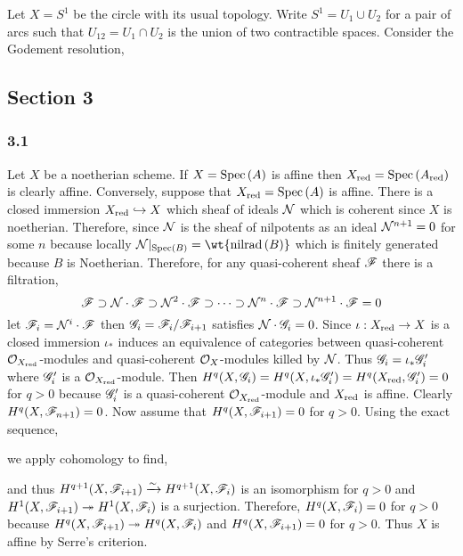 \documentclass[12pt]{article}
\begin{document}
Let $X = S^1$ be the circle with its usual topology. Write $S^1 = U_1 \cup U_2$ for a pair of arcs such that $U_{12} = U_1 \cap U_2$ is the union of two contractible spaces. Consider the Godement resolution,
\begin{center}
\end{center}

\subsection{Section 3}

\subsubsection{3.1}

Let $X$ be a noetherian scheme. If $X = \mathrm{Spec}\left( A \right)$ is affine then $X_{\mathrm{red}} = \mathrm{Spec}\left( A_{\mathrm{red}} \right)$ is clearly affine. Conversely, suppose that $X_{\mathrm{red}} = \mathrm{Spec}\left( A \right)$ is affine. There is a closed immersion $X_{\mathrm{red}} \hookrightarrow X$ which sheaf of ideals $\mathcal{N}$ which is coherent since $X$ is noetherian. Therefore, since $\mathcal{N}$ is the sheaf of nilpotents as an ideal $\mathcal{N}^{n+1} = 0$ for some $n$ because locally $\sN |_{\Spec{B}} = \wt{\nilrad{B}}$ which is finitely generated because $B$ is Noetherian. Therefore, for any quasi-coherent sheaf $\mathscr{F}$ there is a filtration,
\[ \mathscr{F} \supset \mathcal{N} \cdot \mathscr{F} \supset \mathcal{N}^2 \cdot \mathscr{F} \supset \cdots \supset \mathcal{N}^n \cdot \mathscr{F} \supset \mathcal{N}^{n+1} \cdot \mathscr{F} = 0 \]
let $\mathscr{F}_i = \mathcal{N}^i \cdot \mathscr{F}$ then $\mathscr{G}_i = \mathscr{F}_i / \mathscr{F}_{i+1}$ satisfies $\mathcal{N} \cdot \mathscr{G}_i = 0$. Since $\iota : X_{\mathrm{red}} \to X$ is a closed immersion $\iota_*$ induces an equivalence of categories between quasi-coherent $\mathcal{O}_{X_{\mathrm{red}}}$-modules and quasi-coherent $\mathcal{O}_{X}$-modules killed by $\mathcal{N}$. Thus $\mathscr{G}_i = \iota_* \mathscr{G}_i'$ where $\mathscr{G}_i'$ is a $\mathcal{O}_{X_{\mathrm{red}}}$-module. Then $H^q(X, \mathscr{G}_i) = H^q(X, \iota_* \mathscr{G}_i') = H^q(X_{\mathrm{red}}, \mathscr{G}_i') = 0$ for $q > 0$ because $\mathscr{G}_i'$ is a quasi-coherent $\mathcal{O}_{X_{\mathrm{red}}}$-module and $X_{\mathrm{red}}$ is affine. Clearly $H^q(X, \mathscr{F}_{n+1}) = 0$. Now assume that $H^q(X, \mathscr{F}_{i+1}) = 0$ for $q > 0$. Using the exact sequence,
\begin{center}
\end{center}
we apply cohomology to find,
\begin{center}
\end{center}
and thus $H^{q+1}(X, \mathscr{F}_{i+1}) \xrightarrow{\sim} H^{q+1}(X, \mathscr{F}_{i})$ is an isomorphism for $q > 0$ and $H^1(X, \mathscr{F}_{i+1}) \twoheadrightarrow H^1(X, \mathscr{F}_i)$ is a surjection. Therefore, $H^q(X, \mathscr{F}_i) = 0$ for $q > 0$ because $H^q(X, \mathscr{F}_{i+1}) \twoheadrightarrow H^q(X, \mathscr{F}_{i})$ and $H^q(X, \mathscr{F}_{i+1}) = 0$ for $q > 0$. Thus $X$ is affine by Serre's criterion.
\end{document}
